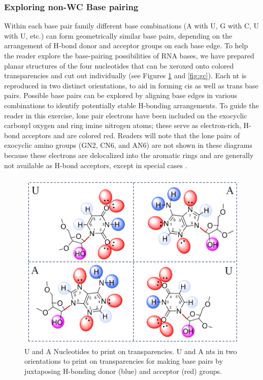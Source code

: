 \subsubsection{Exploring non-WC Base pairing}

Within each base pair family different base combinations (A with U, G with C, U
with U, etc.) can form geometrically similar base pairs, depending on the
arrangement of H-bond donor and acceptor groups on each base edge. To help the
reader explore the base-pairing possibilities of RNA bases, we have prepared
planar structures of the four nucleotides that can be xeroxed onto colored
transparencies and cut out individually (see Figures \ref{fig:ua} and
\ref{fig:gc}). Each nt is reproduced in two distinct orientations, to aid in
forming cis as well as trans base pairs. Possible base pairs can be explored by
aligning base edges in various combinations to identify potentially stable
H-bonding arrangements. To guide the reader in this exercise, lone pair
electrons have been included on the exocyclic carbonyl oxygen and ring imine
nitrogen atoms; these serve as electron-rich, H-bond acceptors and are colored
red. Readers will note that the lone pairs of exocyclic amino groups (GN2, CN6,
and AN6) are not shown in these diagrams because these electrons are delocalized
into the aromatic rings and are generally not available as H-bond acceptors,
except in special cases \cite{Zirbel2009, Sponer2003}.

\begin{figure}
  \includegraphics[width=\linewidth]{chapter-1/figs/ua}
  \caption{U and A Nucleotides to print on transparencies. U and A nts in two
    orientations to print on transparencies for making base pairs by juxtaposing
  H-bonding donor (blue) and acceptor (red) groups. }
  \label{fig:ua}
\end{figure}


